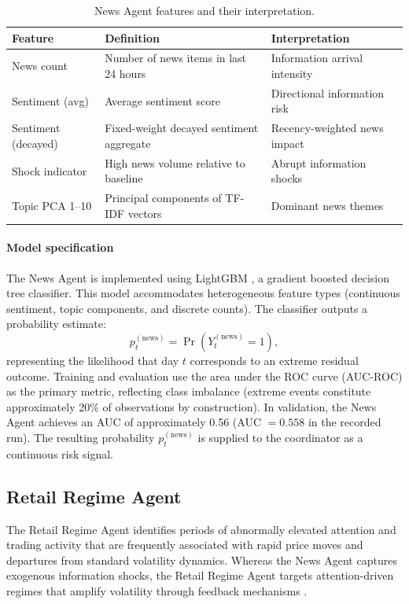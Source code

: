 \documentclass[review]{elsarticle}
\begin{document}
\begin{table}[t]
\centering
\caption{News Agent features and their interpretation.}
\label{tab:news-features}
\begin{tabular}{lll}
\hline
Feature & Definition & Interpretation \\ \hline
News count & Number of news items in last 24 hours & Information arrival intensity \\
Sentiment (avg) & Average sentiment score & Directional information risk \\
Sentiment (decayed) & Fixed-weight decayed sentiment aggregate & Recency-weighted news impact %
\\
Shock indicator & High news volume relative to baseline & Abrupt information shocks \\
Topic PCA 1--10 & Principal components of TF-IDF vectors & Dominant news themes \\
\hline
\end{tabular}
\end{table}

\paragraph{Model specification}
The News Agent is implemented using LightGBM \cite{ke2017}, a gradient boosted decision tree classifier. This model accommodates heterogeneous feature types (continuous sentiment, topic components, and discrete counts). The classifier outputs a probability estimate:
\[
p_{t}^{(\text{news})} = \Pr\!\left(Y_{t}^{(\text{news})} = 1\right),
\]
representing the likelihood that day $t$ corresponds to an extreme residual outcome. Training and evaluation use the area under the ROC curve (AUC-ROC) as the primary metric, reflecting class imbalance (extreme events constitute approximately 20\% of observations by construction). In validation, the News Agent achieves an AUC of approximately 0.56 (AUC $=0.558$ in the recorded run). %
The resulting probability $p_t^{(\text{news})}$ is supplied to the coordinator as a continuous risk signal.

\subsection{Retail Regime Agent}\label{retail-regime-agent}

The Retail Regime Agent identifies periods of abnormally elevated attention and trading activity that are frequently associated with rapid price moves and departures from standard volatility dynamics. Whereas the News Agent captures exogenous information shocks, the Retail Regime Agent targets attention-driven regimes that amplify volatility through feedback mechanisms \cite{barber2008,da2011}.
\end{document}

